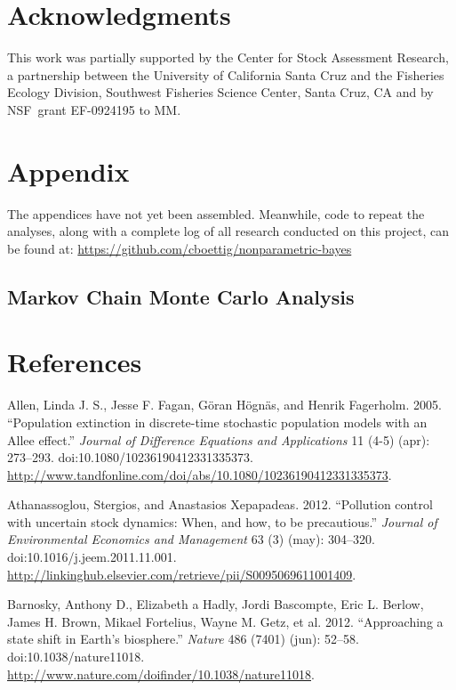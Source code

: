 \documentclass[author-year, review]{elsarticle} %
\begin{document}
\section{Acknowledgments}

This work was partially supported by the Center for Stock Assessment
Research, a partnership between the University of California Santa Cruz
and the Fisheries Ecology Division, Southwest Fisheries Science Center,
Santa Cruz, CA and by NSF~grant EF-0924195 to MM.

\section{Appendix}

The appendices have not yet been assembled. Meanwhile, code to repeat
the analyses, along with a complete log of all research conducted on
this project, can be found at:
\href{https://github.com/cboettig/nonparametric-bayes/}{https://github.com/cboettig/nonparametric-bayes}

\subsection{Markov Chain Monte Carlo Analysis}

\section{References}

Allen, Linda J. S., Jesse F. Fagan, Göran Högnäs, and Henrik Fagerholm.
2005. ``Population extinction in discrete-time stochastic population
models with an Allee effect.'' \emph{Journal of Difference Equations and
Applications} 11 (4-5) (apr): 273--293.
doi:10.1080/10236190412331335373.
\url{http://www.tandfonline.com/doi/abs/10.1080/10236190412331335373}.

Athanassoglou, Stergios, and Anastasios Xepapadeas. 2012. ``Pollution
control with uncertain stock dynamics: When, and how, to be
precautious.'' \emph{Journal of Environmental Economics and Management}
63 (3) (may): 304--320. doi:10.1016/j.jeem.2011.11.001.
\url{http://linkinghub.elsevier.com/retrieve/pii/S0095069611001409}.

Barnosky, Anthony D., Elizabeth a Hadly, Jordi Bascompte, Eric L.
Berlow, James H. Brown, Mikael Fortelius, Wayne M. Getz, et al. 2012.
``Approaching a state shift in Earth's biosphere.'' \emph{Nature} 486
(7401) (jun): 52--58. doi:10.1038/nature11018.
\url{http://www.nature.com/doifinder/10.1038/nature11018}.
\end{document}
